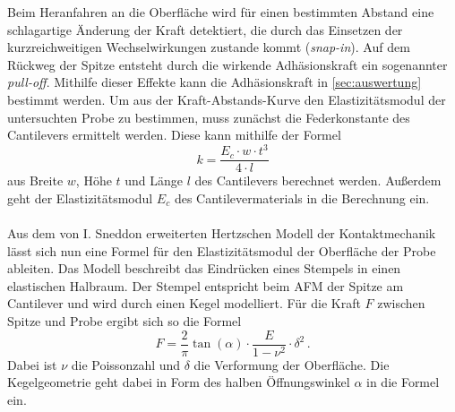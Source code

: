 Beim Heranfahren an die Oberfläche wird für einen bestimmten Abstand eine schlagartige Änderung der Kraft detektiert, die durch das Einsetzen der kurzreichweitigen Wechselwirkungen zustande kommt (\textit{snap-in}). Auf dem Rückweg der Spitze entsteht durch die wirkende Adhäsionskraft ein sogenannter \textit{pull-off}. Mithilfe dieser Effekte kann die Adhäsionskraft in \autoref{sec:auswertung} bestimmt werden.
Um aus der Kraft-Abstands-Kurve den Elastizitätsmodul der untersuchten Probe zu bestimmen, muss zunächst die Federkonstante des Cantilevers ermittelt werden. Diese kann mithilfe der Formel
\begin{equation}
  \label{eqn:federkonst}
  k = \frac{E_c\cdot w\cdot t^3}{4\cdot l}
\end{equation}
aus Breite $w$, Höhe $t$ und Länge $l$ des Cantilevers berechnet werden. Außerdem geht der Elastizitätsmodul $E_c$ des Cantilevermaterials in die Berechnung ein.\\
\\
Aus dem von I. Sneddon erweiterten Hertzschen Modell der Kontaktmechanik lässt sich nun eine Formel für den Elastizitätsmodul der Oberfläche der Probe ableiten. Das Modell beschreibt das Eindrücken eines Stempels in einen elastischen Halbraum. Der Stempel entspricht beim AFM der Spitze am Cantilever und wird durch einen Kegel modelliert. Für die Kraft $F$ zwischen Spitze und Probe ergibt sich so die Formel
\begin{equation}
  \label{eqn:emodul}
  F = \frac{2}{\pi} \tan{(\alpha)}\cdot\frac{E}{1-\nu^2}\cdot\delta^2\, .
\end{equation}
Dabei ist $\nu$ die Poissonzahl und $\delta$ die Verformung der Oberfläche.
Die Kegelgeometrie geht dabei in Form des halben Öffnungswinkel $\alpha$ in die Formel ein.
